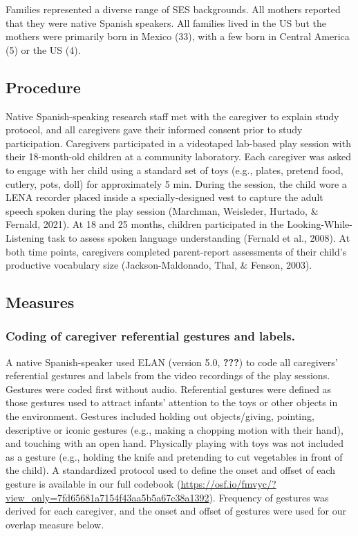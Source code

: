 \documentclass[
  english,
  man,floatsintext]{apa6}
\begin{document}
Families represented a diverse range of SES backgrounds. All mothers reported that they were native Spanish speakers. All families lived in the US but the mothers were primarily born in Mexico (33), with a few born in Central America (5) or the US (4).

\hypertarget{procedure}{%
\subsection{Procedure}\label{procedure}}

Native Spanish-speaking research staff met with the caregiver to explain study protocol, and all caregivers gave their informed consent prior to study participation. Caregivers participated in a videotaped lab-based play session with their 18-month-old children at a community laboratory. Each caregiver was asked to engage with her child using a standard set of toys (e.g., plates, pretend food, cutlery, pots, doll) for approximately 5 min. During the session, the child wore a LENA recorder placed inside a specially-designed vest to capture the adult speech spoken during the play session (Marchman, Weisleder, Hurtado, \& Fernald, 2021). At 18 and 25 months, children participated in the Looking-While-Listening task to assess spoken language understanding (Fernald et al., 2008). At both time points, caregivers completed parent-report assessments of their child's productive vocabulary size (Jackson-Maldonado, Thal, \& Fenson, 2003).

\hypertarget{measures}{%
\subsection{Measures}\label{measures}}

\hypertarget{coding-of-caregiver-referential-gestures-and-labels.}{%
\subsubsection{Coding of caregiver referential gestures and labels.}\label{coding-of-caregiver-referential-gestures-and-labels.}}

A native Spanish-speaker used ELAN (version 5.0, {\textbf{???}}) to code all caregivers' referential gestures and labels from the video recordings of the play sessions. Gestures were coded first without audio. Referential gestures were defined as those gestures used to attract infants' attention to the toys or other objects in the environment. Gestures included holding out objects/giving, pointing, descriptive or iconic gestures (e.g., making a chopping motion with their hand), and touching with an open hand. Physically playing with toys was not included as a gesture (e.g., holding the knife and pretending to cut vegetables in front of the child). A standardized protocol used to define the onset and offset of each gesture is available in our full codebook (\url{https://osf.io/fmvyc/?view_only=7fd65681a7154f43aa5b5a67c38a1392}). Frequency of gestures was derived for each caregiver, and the onset and offset of gestures were used for our overlap measure below.
\end{document}
